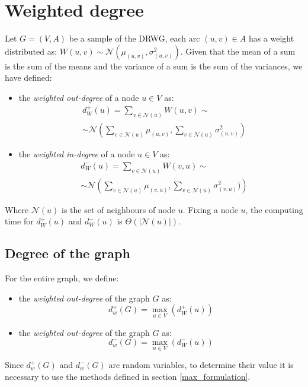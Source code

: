 \section{Weighted degree}\label{weighted_degree}
Let \( G = (V, A) \) be a sample of the DRWG, each arc \( (u, v) \in A \) has a weight distributed as: $W(u, v) \sim \mathcal{N}(\mu_{(u, v)}, \sigma^2_{(u, v)})$.
Given that the mean of a sum is the sum of the means and the variance of a sum is the sum of the variances, we have defined:
\begin{itemize}
	\item the \textit{weighted out-degree} of a node $u\in V$ as:
	\begin{align*}
		&d_W^+(u) = \sum_{v \in \mathcal{N}(u)} W(u, v) \sim \\
		&\sim \mathcal{N} \left( \sum_{v \in \mathcal{N}(u)} \mu_{(u, v)}, \sum_{v \in \mathcal{N}(u)} \sigma^2_{(u, v)}\right)
	\end{align*}
	\item the \textit{weighted in-degree} of a node $u\in V$ as:
	\begin{align*}
		&d_W^-(u) = \sum_{v \in \mathcal{N}(u)} W(v, u) \sim \\
		&\sim \mathcal{N}\left(\sum_{v \in \mathcal{N}(u)} \mu_{(v, u)}, \sum_{v \in \mathcal{N}(u)} \sigma^2_{(v, u)})\right)
	\end{align*}
\end{itemize}

Where $\mathcal{N}(u)$ is the set of neighbours of node $u$.
Fixing a node $u$, the computing time for $d_W^+(u)$ and $d_W^-(u)$ is $\Theta(|\mathcal{N}(u)|)$.

\subsection{Degree of the graph}
For the entire graph, we define:
\begin{itemize}
	\item the \textit{weighted out-degree} of the graph $G$ as:
	$$d^+_w(G) = \max_{u\in V}(d_W^+(u))$$
	\item the \textit{weighted out-degree} of the graph $G$ as:
	$$d^-_w(G) = \max_{u\in V}(d_W^-(u))$$
\end{itemize}
Since $d^+_w(G)$ and $d^-_w(G)$ are random variables, to determine their value it is necessary to use the methods defined in section \ref{max_formulation}.